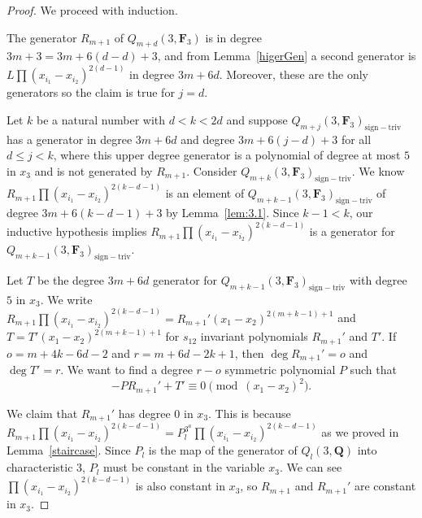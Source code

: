 \documentclass[pdftex]{sigma}
\theoremstyle{definition}
\numberwithin{equation}{section}
\newcommand{\siv}{\mathrm{sign-triv}}
\begin{document}
\begin{proof} We proceed with induction.

 The generator $R_{m+1}$ of $Q_{m+d}(3,\mathbf{F}_3)$ is in degree $3m+3=3m+6(d-d)+3$, and from Lemma~\ref{higerGen} a second generator is $L\prod(x_{i_1}-x_{i_2})^{2(d-1)}$ in degree $3m+6d$. Moreover, these are the only generators so the claim is true for $j=d$.

 Let $k$ be a natural number with $d<k<2d$ and suppose $Q_{m+j}(3,\mathbf{F}_3)_{\siv}$ has a generator in degree $3m+6d$ and degree $3m+6(j-d)+3$ for all $d\leq j < k$, where this upper degree generator is a polynomial of degree at most $5$ in $x_3$ and is not generated by $R_{m+1}$. Consider $Q_{m+k}(3,\mathbf{F}_3)_{\siv}$. We know $R_{m+1}\prod(x_{i_1}-x_{i_2})^{2(k-d-1)}$ is an element of $Q_{m+k-1}(3,\mathbf{F}_3)_{\siv}$ of degree $3m+6(k-d-1)+3$ by Lemma~\ref{lem:3.1}. Since $k-1<k$, our inductive hypothesis implies $R_{m+1}\prod(x_{i_1}-x_{i_2})^{2(k-d-1)}$ is a generator for $Q_{m+k-1}(3,\mathbf{F}_3)_{\siv}$.

 Let $T$ be the degree $3m+6d$ generator for $Q_{m+k-1}(3,\mathbf{F}_3)_{\siv}$ with degree $5$ in $x_3$. We write $R_{m+1}\prod(x_{i_1}-x_{i_2})^{2(k-d-1)} = R_{m+1}'(x_1-x_2)^{2(m+k-1)+1}$ and $T=T'(x_1-x_2)^{2(m+k-1)+1}$ for $s_{12}$ invariant polynomials $R_{m+1}'$ and $T'$. If $o = m+4k-6d-2$ and $r = m+6d-2k+1$, then $\deg R_{m+1}' =o$ and $\deg T' = r$. We want to find a degree $r-o$ symmetric polynomial $P$ such that
 \[-PR_{m+1}'+T'\equiv 0 \pmod{(x_1-x_2)^2}.\]

 We claim that $R_{m+1}'$ has degree $0$ in $x_3$. This is because $R_{m+1}\prod (x_{i_1}-x_{i_2})^{2(k-d-1)}=P_l^{3^a}\prod (x_{i_1}-x_{i_2})^{2(k-d-1)}$ as we proved in Lemma~\ref{staircase}. Since $P_l$ is the map of the generator of $Q_l(3,\mathbf{Q})$ into characteristic $3$, $P_l$ must be constant in the variable $x_3$. We can see ${\prod (x_{i_1}-x_{i_2})^{2(k-d-1)}}$ is also constant in $x_3$, so $R_{m+1}$ and $R_{m+1}'$ are constant in $x_3$.


\end{proof}
\end{document}
